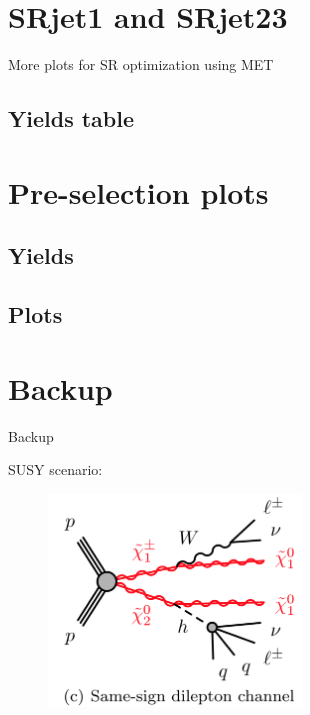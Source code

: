 \documentclass[mathserif,serif]{beamer}
\begin{document}
\section{SRjet1 and SRjet23}
\begin{frame}
\begin{center}
\huge
More plots for SR optimization using MET
\end{center}
\end{frame}




\subsection{Yields table}



\section{Pre-selection plots}
\subsection{Yields}

\subsection{Plots}


\section*{Backup}
\begin{frame}
\begin{center}
\huge
Backup
\end{center}
\end{frame}

\begin{frame}
\small
SUSY scenario:\\
\begin{figure}
\includegraphics[width=0.6\textwidth]{data/photo/Wh.png}
\end{figure}
\end{frame}
\end{document}
